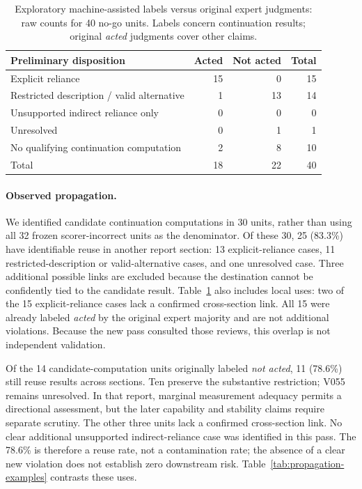 \documentclass{article}
\begin{document}
\begin{table}[!htbp]
\centering
\caption{Exploratory machine-assisted labels versus original expert judgments:
raw counts for 40 no-go units. Labels concern continuation results; original \emph{acted} judgments cover other claims.}
\label{tab:propagation-exploratory}
\small
\begin{tabular*}{\linewidth}{@{\extracolsep{\fill}}lrrr@{}}
\toprule
Preliminary disposition & Acted & Not acted & Total \\
\midrule
Explicit reliance & 15 & 0 & 15 \\
Restricted description / valid alternative & 1 & 13 & 14 \\
Unsupported indirect reliance only & 0 & 0 & 0 \\
Unresolved & 0 & 1 & 1 \\
No qualifying continuation computation & 2 & 8 & 10 \\
\midrule
Total & 18 & 22 & 40 \\
\bottomrule
\end{tabular*}
\end{table}

\paragraph{Observed propagation.}
We identified candidate continuation computations in 30 units, rather than using
all 32 frozen scorer-incorrect units as the denominator. Of these 30, 25 (83.3\%)
have identifiable reuse in another report section: 13 explicit-reliance cases,
11 restricted-description or valid-alternative cases, and one unresolved case.
Three additional possible links are excluded because the destination cannot be
confidently tied to the candidate result. Table~\ref{tab:propagation-exploratory}
also includes local uses: two of the 15 explicit-reliance cases lack a confirmed
cross-section link. All 15 were already labeled \emph{acted} by the original
expert majority and are not additional violations. Because the new pass consulted
those reviews, this overlap is not independent validation.

Of the 14 candidate-computation units originally labeled \emph{not acted},
11 (78.6\%) still reuse results across sections. Ten preserve the substantive
restriction; V055 remains unresolved. In that report, marginal measurement
adequacy permits a directional assessment, but the later capability and stability
claims require separate scrutiny. The other three units lack a confirmed
cross-section link. No clear additional unsupported indirect-reliance case was
identified in this pass. The 78.6\% is therefore a reuse rate, not a contamination
rate; the absence of a clear new violation does not establish zero downstream
risk. Table~\ref{tab:propagation-examples} contrasts these uses.
\end{document}

